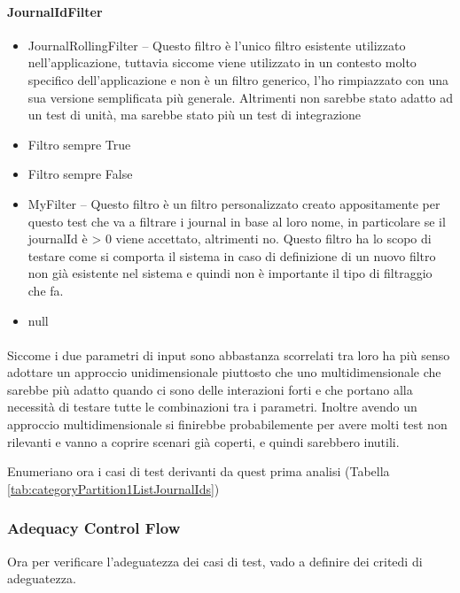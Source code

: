 \documentclass[12pt, a4paper]{article}
\begin{document}
\paragraph{JournalIdFilter}
\begin{itemize}
    \item JournalRollingFilter  -- Questo filtro è l'unico filtro esistente utilizzato nell'applicazione, 
    tuttavia siccome viene utilizzato in un contesto molto specifico dell'applicazione e non è un filtro generico, l'ho rimpiazzato
    con una sua versione semplificata più generale. Altrimenti non sarebbe stato adatto ad un test di unità, ma sarebbe stato 
    più un test di integrazione
    \item Filtro sempre True
    \item Filtro sempre False
    \item MyFilter -- Questo filtro è un filtro personalizzato creato appositamente per questo test che va a filtrare i journal
    in base al loro nome, in particolare se il journalId è > 0 viene accettato, altrimenti no. 
    Questo filtro ha lo scopo di testare come si comporta il sistema in caso di definizione di un nuovo filtro non già esistente 
    nel sistema e quindi non è importante il tipo di filtraggio che fa.
    \item null
\end{itemize}

\paragraph{}
\par
Siccome i due parametri di input sono abbastanza scorrelati tra loro ha più senso adottare un approccio 
unidimensionale piuttosto che uno multidimensionale che sarebbe più adatto quando ci sono delle interazioni forti
e che portano alla necessità di testare tutte le combinazioni tra i parametri. Inoltre avendo un approccio multidimensionale
si finirebbe probabilemente per avere molti test non rilevanti e vanno a coprire scenari già coperti, e quindi sarebbero inutili.

Enumeriano ora i casi di test derivanti da quest prima analisi (Tabella \ref{tab:categoryPartition1ListJournalIds})



\subsubsection{Adequacy Control Flow}
Ora per verificare l'adeguatezza dei casi di test, vado a definire dei critedi di adeguatezza.
\end{document}
